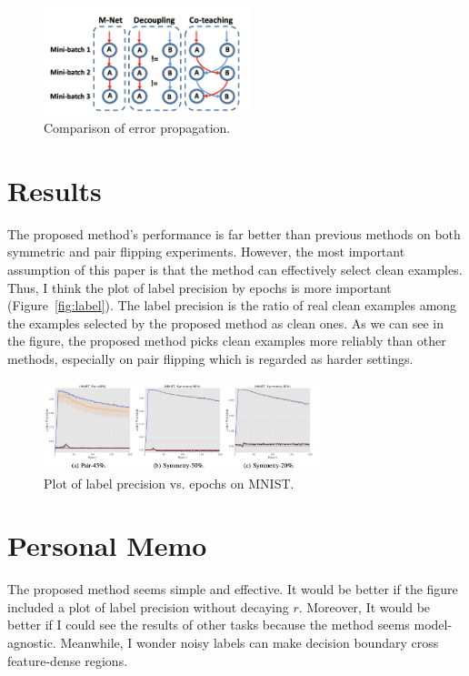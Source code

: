 \documentclass[10pt,twocolumn,letterpaper]{article}
\begin{document}
 \begin{figure}[b]
	\centering
	\includegraphics[width=6cm]{figures/coteaching.png}
	\caption{Comparison of error propagation.}
\end{figure}\label{fig:error}

\section{Results}
The proposed method's performance is far better than previous methods on both symmetric and pair flipping experiments. However, the most important assumption of this paper is that the method can effectively select clean examples. Thus, I think the plot of label precision by epochs is more important (Figure~\ref{fig:label}). The label precision is the ratio of real clean examples among the examples selected by the proposed method as clean ones. As we can see in the figure, the proposed method picks clean examples more reliably than other methods, especially on pair flipping which is regarded as harder settings.

 \begin{figure}[t]
	\centering
	\includegraphics[width=8cm]{figures/labelprecision.png}
	\caption{Plot of label precision vs. epochs on MNIST.}
\end{figure}\label{fig:label}

\section{Personal Memo}
The proposed method seems simple and effective. It would be better if the figure included a plot of label precision without decaying $r$. Moreover, It would be better if I could see the results of other tasks because the method seems model-agnostic. Meanwhile, I wonder noisy labels can make decision boundary cross feature-dense regions. 

{\small

% 
}
\end{document}
